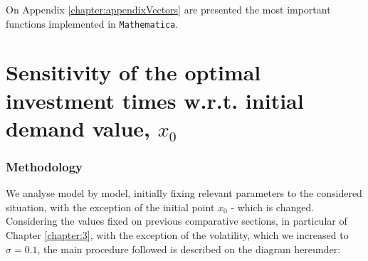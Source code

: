 On Appendix \ref{chapter:appendixVectors} are presented the most important functions implemented in \texttt{Mathematica}.

\section{Sensitivity of the optimal investment times w.r.t. initial demand value, $x_0$}
\label{section:x0}

\subsubsection{Methodology}


We analyse model by model, initially fixing relevant parameters to the considered situation, with the exception of the initial point $x_0$ - which is changed.
Considering the values fixed on previous comparative sections, in particular of Chapter \ref{chapter:3}, with the exception of the volatility, which we increased to $\sigma=0.1$, the main procedure followed is described on the diagram hereunder:

